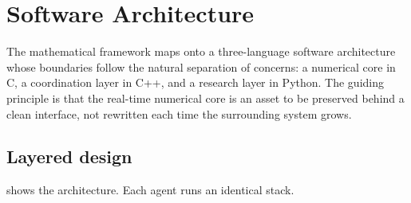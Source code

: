 \chapter{Software Architecture}
\label{ch:architecture}

The mathematical framework maps onto a three-language software architecture whose
boundaries follow the natural separation of concerns: a numerical core in C, a
coordination layer in C++, and a research layer in Python. The guiding principle
is that the real-time numerical core is an asset to be preserved behind a clean
interface, not rewritten each time the surrounding system grows.

\section{Layered design}

 shows the architecture. Each agent runs an identical stack.

